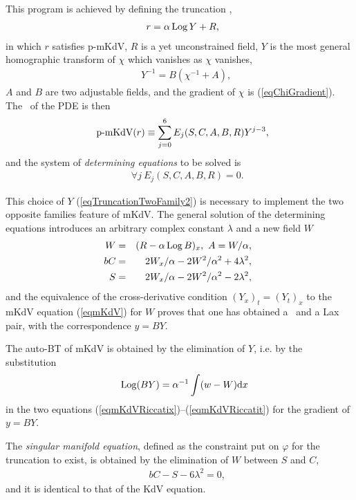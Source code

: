 \documentclass[10pt]{article}
\begin{document}
This program is achieved by defining the truncation \cite{Pickering1996SMM},
\begin{eqnarray}
& &
r=\alpha \mathop{\rm Log}\nolimits Y + R,\
\end{eqnarray}
in which $r$ satisfies p-mKdV,
$R$ is a yet unconstrained field,
$Y$ is the most general homographic transform of $\chi$ 
which vanishes as $\chi$ vanishes,
\begin{eqnarray}
& &
Y^{-1}=B(\chi^{-1} + A),\
\label{eqTruncationTwoFamily2}
\end{eqnarray}
$A$ and $B$ are two adjustable fields,
and the gradient of $\chi$ is (\ref{eqChiGradient}).
The \LHS\ of the PDE is then
\begin{eqnarray}
& &
\hbox{p-mKdV}(r) \equiv
\sum_{j=0}^{6} E_j(S,C,A,B,R) Y^{j-3},\
\end{eqnarray}
and the system of \textit{determining equations} to be solved is
\begin{eqnarray}
& &
\forall j\
E_{j}(S,C,A,B,R) =0.
\label{eqTruncationTwoFamily4}
\end{eqnarray}

This choice of $Y$ (\ref{eqTruncationTwoFamily2}) is necessary to implement
the two opposite families feature of mKdV.
The general solution of the determining equations 
introduces
an arbitrary complex constant $\lambda$ 
and a new field $W$
\cite{Pickering1996SMM}
\begin{eqnarray}
W & = & (R- \alpha \mathop{\rm Log}\nolimits B)_x,\
A = W / \alpha,\
\nonumber
\\
b C & = & 2 W_{x} / \alpha -2 W^2 / \alpha^2 +4 \lambda^2,\
\nonumber
\\
S & = &   2 W_{x} / \alpha -2 W^2 / \alpha^2 -2 \lambda^2,\
\label{eqmKdVSCAB}
\end{eqnarray}
and the equivalence of the cross-derivative condition $(Y_x)_t=(Y_t)_x$ 
to the mKdV equation (\ref{eqmKdV}) for $W$
proves that one has obtained a \formerDT\ and a Lax pair,
with the correspondence $y=B Y$.

The auto-BT of mKdV
is obtained by the elimination of $Y$,
i.e. by the substitution
\begin{eqnarray}
& &
\mathop{\rm Log}\nolimits (B Y) = \alpha^{-1} \int (w-W) \hbox{d} x
\end{eqnarray}
in the two equations (\ref{eqmKdVRiccatix})--(\ref{eqmKdVRiccatit})
for the gradient of $ y=B Y$.

The \textit{singular manifold equation},
defined \cite{WTC} as the constraint put on $\varphi$ 
for the truncation to exist,
is obtained by the elimination of $W$ between $S$ and $C$,
\begin{eqnarray}
& &
b C - S - 6 \lambda^2 = 0,
\end{eqnarray}
and it is identical to that of the KdV equation.
\end{document}
